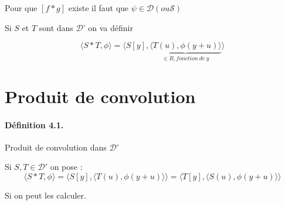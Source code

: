 \documentclass[12pt,a4paper]{report}
\newcommand{\D}{\ensuremath{\mathcal{D}}}
\newcommand{\Sf}{\ensuremath{\mathcal{S}}}
\begin{document}
Pour que \([f*g]\) existe il faut que \(\psi \in \D (ou \Sf)\)

Si \(S\) et \(T\) sont dans \D' on va définir

\[
	\langle S*T, \phi \rangle = \langle S[y], \underbrace{\langle T(u), \phi(y+u)\rangle }_{\in R, fonction~de~y} \rangle
\]

\section{ Produit de convolution}

\paragraph{Définition 4.1.} Produit de convolution dans \D'

Si \(S,T \in \D'\) on pose :
\[
	\langle S*T, \phi \rangle = \langle S[y], \langle T(u), \phi(y+u)\rangle \rangle = \langle T[y], \langle S(u), \phi(y+u)\rangle \rangle
\]

Si on peut les calculer.
\end{document}
